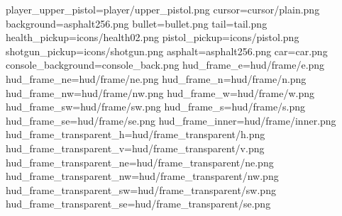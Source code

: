 player_upper_pistol=player/upper_pistol.png
cursor=cursor/plain.png
background=asphalt256.png
bullet=bullet.png
tail=tail.png
health_pickup=icons/health02.png
pistol_pickup=icons/pistol.png
shotgun_pickup=icons/shotgun.png
asphalt=asphalt256.png
car=car.png
console_background=console_back.png
hud_frame_e=hud/frame/e.png
hud_frame_ne=hud/frame/ne.png
hud_frame_n=hud/frame/n.png
hud_frame_nw=hud/frame/nw.png
hud_frame_w=hud/frame/w.png
hud_frame_sw=hud/frame/sw.png
hud_frame_s=hud/frame/s.png
hud_frame_se=hud/frame/se.png
hud_frame_inner=hud/frame/inner.png
hud_frame_transparent_h=hud/frame_transparent/h.png
hud_frame_transparent_v=hud/frame_transparent/v.png
hud_frame_transparent_ne=hud/frame_transparent/ne.png
hud_frame_transparent_nw=hud/frame_transparent/nw.png
hud_frame_transparent_sw=hud/frame_transparent/sw.png
hud_frame_transparent_se=hud/frame_transparent/se.png
